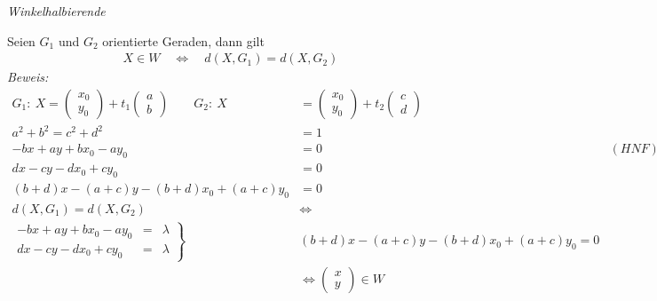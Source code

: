 \begin{mylemma}\textit{Winkelhalbierende}\medskip

    Seien $G_1$ und $G_2$ orientierte Geraden, dann gilt
    \begin{align*}
        X \in W \quad \Leftrightarrow \quad d\left( X, G_1 \right) = d\left( X, G_2 \right)
    \end{align*}
    \textit{Beweis:}
    \begin{align*}
        G_1:\ X =
        \begin{pmatrix}
            x_0\\ y_0
        \end{pmatrix}
        + t_1
        \begin{pmatrix}
            a\\ b
        \end{pmatrix}
        \qquad
        G_2:\ X & =
        \begin{pmatrix}
            x_0\\ y_0
        \end{pmatrix}
        + t_2
        \begin{pmatrix}
            c\\ d
        \end{pmatrix}\\
        a^2 + b^2 = c^2 + d^2 & = 1\\
        -b x + a y + b x_0 - a y_0 & = 0 & (HNF)\\
        d x - c y - d x_0 + c y_0 & = 0\\
        (b + d)x - (a + c)y - (b + d)x_0 + (a + c)y_0 & = 0\\
        d\left( X, G_1 \right) = d\left( X, G_2 \right) & \Leftrightarrow\\
        \left.
        \begin{matrix}
            -b x + a y + b x_0 - a y_0 & = & \lambda\\
            d x - c y - d x_0 + c y_0 & = & \lambda
        \end{matrix}
        \right\} & (b + d) x - (a + c) y - (b + d) x_0 + (a + c) y_0 = 0\\
        & \Leftrightarrow
        \begin{pmatrix}
            x\\ y
        \end{pmatrix}
        \in W
    \end{align*}
\end{mylemma}

